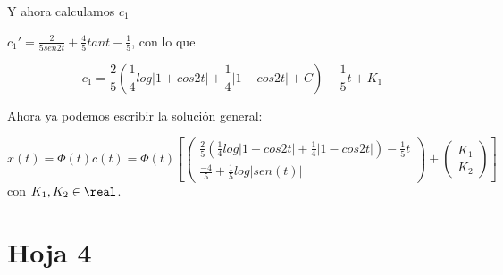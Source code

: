 \documentclass[nochap]{apuntes}
\begin{document}
\begin{problem}[31]
Y ahora calculamos $c_1$ 

$\displaystyle c_1'=\frac{2}{5sen2t}+\frac{4}{5}tant-\frac{1}{5}$, con lo que

\[c_1 = \frac{2}{5}\left(\frac{1}{4}log|1+cos2t| + \frac{1}{4}|1-cos2t| + C\right) - \frac{1}{5}t+K_1\]

Ahora ya podemos escribir la solución general:

\[x(t) = \Phi(t)c(t) = \Phi(t)\left[
\begin{pmatrix}
\frac{2}{5}\left(\frac{1}{4}log|1+cos2t| + \frac{1}{4}|1-cos2t|\right) - \frac{1}{5}t\\
\frac{-4}{5} + \frac{1}{5}log|sen(t)|
\end{pmatrix} + \begin{pmatrix}
K_1\\K_2
\end{pmatrix}
\right]\]
con $K_1,K_2 \in \real$.
\end{problem}

\section{Hoja 4}
\end{document}
